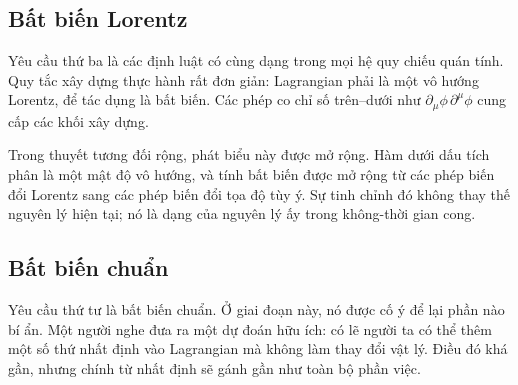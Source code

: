 \subsection{Bất biến Lorentz}

Yêu cầu thứ ba là các định luật có cùng dạng trong mọi hệ quy chiếu quán tính. Quy tắc xây dựng thực hành rất đơn giản: Lagrangian phải là một vô hướng Lorentz, để tác dụng là bất biến. Các phép co chỉ số trên--dưới như \(\partial_\mu\phi\,\partial^\mu\phi\) cung cấp các khối xây dựng.

Trong thuyết tương đối rộng, phát biểu này được mở rộng. Hàm dưới dấu tích phân là một mật độ vô hướng, và tính bất biến được mở rộng từ các phép biến đổi Lorentz sang các phép biến đổi tọa độ tùy ý. Sự tinh chỉnh đó không thay thế nguyên lý hiện tại; nó là dạng của nguyên lý ấy trong không-thời gian cong.

\begin{classroomqa}
\end{classroomqa}

\begin{classroomqa}
\end{classroomqa}

\subsection{Bất biến chuẩn}

Yêu cầu thứ tư là bất biến chuẩn. Ở giai đoạn này, nó được cố ý để lại phần nào bí ẩn. Một người nghe đưa ra một dự đoán hữu ích: có lẽ người ta có thể thêm một số thứ nhất định vào Lagrangian mà không làm thay đổi vật lý. Điều đó khá gần, nhưng chính từ nhất định sẽ gánh gần như toàn bộ phần việc.

